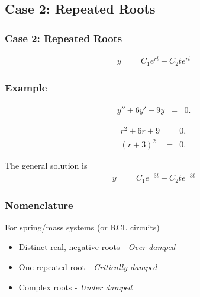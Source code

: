 \subsection{Case 2: Repeated Roots}

\begin{frame}
  \frametitle{Case 2: Repeated Roots}

  \begin{eqnarray*}
    y & = & C_1 e^{rt} + C_2 t e^{rt}
  \end{eqnarray*}


\end{frame}


\begin{frame}
  \frametitle{Example}

  \begin{eqnarray*}
    y'' + 6y' + 9y & = & 0.
  \end{eqnarray*}

  {
    \begin{eqnarray*}
      r^2 + 6r + 9 & = & 0, \\
      (r+3)^2 & = & 0.
    \end{eqnarray*}

    The general solution is
    \begin{eqnarray*}
      y & = & C_1 e^{-3t} + C_2 t e^{-3t}
    \end{eqnarray*}

  }

\end{frame}


\begin{frame}
  \frametitle{Nomenclature}

  For spring/mass systems (or RCL circuits)
  \begin{itemize}
  \item Distinct real, negative roots - \textit{Over damped}
  \item One repeated root - \textit{Critically damped}
  \item Complex roots   - \textit{Under damped}
  \end{itemize}

\end{frame}

